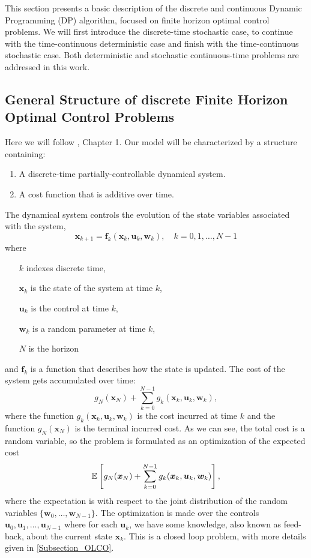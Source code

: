 This section presents a basic description of the discrete and continuous Dynamic
Programming (DP) algorithm, focused on finite horizon optimal control problems.
We will first introduce the discrete-time stochastic case, to continue with the
time-continuous deterministic case and finish with the time-continuous stochastic
case. Both deterministic and stochastic continuous-time problems are addressed in this work.

\subsection{General Structure of discrete Finite Horizon Optimal Control Problems}

Here we will follow \cite{berkovitz2013optimal}, Chapter 1. 
Our model will be characterized by a structure containing:
\begin{enumerate}
\item A discrete-time partially-controllable dynamical system.
\item A cost function that is additive over time.
\end{enumerate}
The dynamical system controls the evolution of the state variables associated 
with the system,
\begin{equation}
\bm{x}_{k+1} = \bm{f}_k(\bm{x}_k,\bm{u}_k,\bm{w}_k),\quad k=0,1,\dots,N-1
\label{Disc_Dyn}
\end{equation}
where
\begin{enumerate}
\item[$k$] indexes discrete time,
\item[$\bm{x}_k$] is the state of the system at time $k$,
\item[$\bm{u}_k$] is the control at time $k$,
\item[$\bm{w}_k$] is a random parameter at time $k$,
\item[$N$] is the horizon
\end{enumerate}
and $\bm{f}_k$ is a function that describes how the state is updated. 
The cost of the system gets accumulated over time:
\begin{equation*}
g_N(\bm{x}_N)+\sum_{k=0}^{N-1}g_k(\bm{x}_k,\bm{u}_k,\bm{w}_k),
\end{equation*}
where the function $g_k(\bm{x}_k,\bm{u}_k,\bm{w}_k)$ is the cost incurred at 
time $k$ and the function $g_N(\bm{x}_N)$ is the terminal incurred cost. As we can 
see, the total cost is a random variable, so the
problem is formulated as an optimization of the expected cost
\begin{equation*}
\mathbb{E}\left[g_N(\bm{x}_N)+\sum_{k=0}^{N-1}g_k(\bm{x}_k,\bm{u}_k,\bm{w}_k)\right],
\end{equation*}
where the expectation is with respect to the joint distribution of the random
variables $\{\bm{w}_0,\dots,\bm{w}_{N-1}\}$. The optimization is made over
the controls $\bm{u}_0,\bm{u}_1,\dots,\bm{u}_{N-1}$ where for each
$\bm{u}_k$, we have some knowledge, also known as feed-back, about the current 
state $\bm{x}_k$. This is a closed loop problem, with more details given in
 \ref{Subsection_OLCO}.

